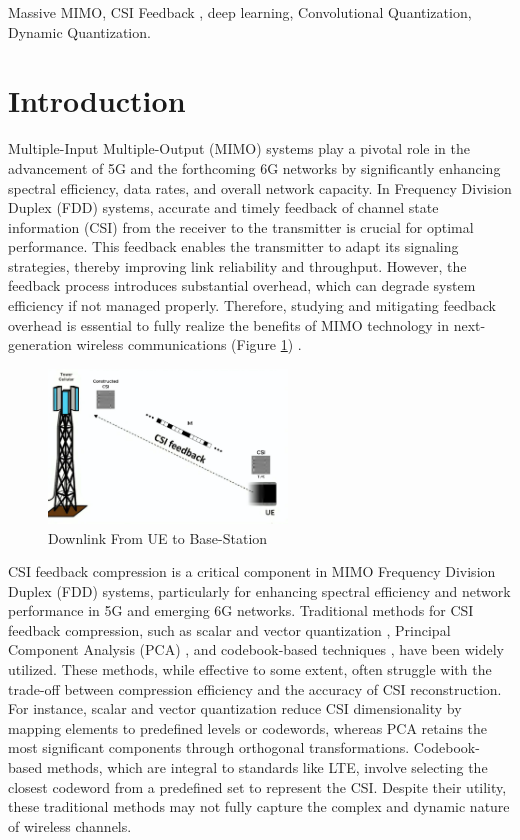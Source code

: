 \documentclass[lettersize,journal]{IEEEtran}
\begin{document}
\begin{IEEEkeywords}
Massive MIMO, CSI Feedback , deep learning, Convolutional Quantization,
Dynamic Quantization.
\end{IEEEkeywords}


\section{Introduction}
Multiple-Input Multiple-Output (MIMO) systems play a pivotal role in the advancement of 5G and the forthcoming 6G networks by significantly enhancing spectral efficiency, data rates, and overall network capacity. \cite{abc} In Frequency Division Duplex (FDD) systems, accurate and timely feedback of channel state information (CSI) from the receiver to the transmitter is crucial for optimal performance. This feedback enables the transmitter to adapt its signaling strategies, thereby improving link reliability and throughput. However, the feedback process introduces substantial overhead, which can degrade system efficiency if not managed properly. Therefore, studying and mitigating feedback overhead is essential to fully realize the benefits of MIMO technology in next-generation wireless communications (Figure \ref{csifeedbackimage}) \cite{abd}.

\begin{figure}[!t]
	\centering
	\includegraphics[width=2.5in]{BTS_User_Equipement.pdf}
	\caption{Downlink From UE to Base-Station}
	\label{csifeedbackimage}
\end{figure}

CSI feedback compression is a critical component in MIMO Frequency Division Duplex (FDD) systems, particularly for enhancing spectral efficiency and network performance in 5G and emerging 6G networks. Traditional methods for CSI feedback compression, such as scalar and vector quantization \cite{vectorquantiz}, Principal Component Analysis (PCA) \cite{pca}, and codebook-based techniques \cite{compressivesensing}, have been widely utilized. These methods, while effective to some extent, often struggle with the trade-off between compression efficiency and the accuracy of CSI reconstruction. For instance, scalar and vector quantization reduce CSI dimensionality by mapping elements to predefined levels or codewords, whereas PCA retains the most significant components through orthogonal transformations. Codebook-based methods, which are integral to standards like LTE, involve selecting the closest codeword from a predefined set to represent the CSI. Despite their utility, these traditional methods may not fully capture the complex and dynamic nature of wireless channels.
\end{document}
